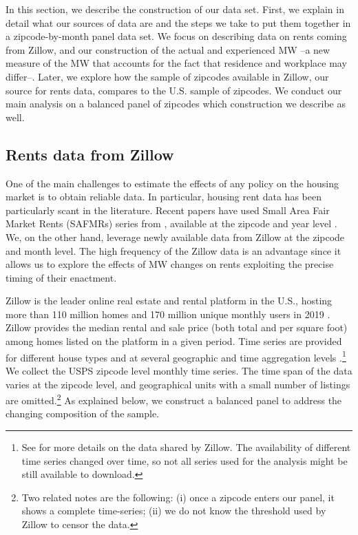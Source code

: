 
In this section, we describe the construction of our data set. First, we explain in detail
what our sources of data are and the steps we take to put them together in a zipcode-by-month
panel data set. We focus on describing data on rents coming from Zillow, and our
construction of the actual and experienced MW --a new measure of the MW that accounts
for the fact that residence and workplace may differ--. Later, we explore how the 
sample of zipcodes available in Zillow, our source for rents data, compares to the 
U.S. sample of zipcodes. We conduct our main analysis on a balanced panel of zipcodes 
which construction we describe as well.

\subsection{Rents data from Zillow}

One of the main challenges to estimate the effects of any policy on the housing market
is to obtain reliable data. In particular, housing rent data has been particularly scant
in the literature. Recent papers have used Small Area Fair Market Rents (SAFMRs) series 
from \textcite{hud}, available at the zipcode and year level \parencite{Tidemann2018, 
Yamagishi2019}. We, on the other hand, leverage newly available data from Zillow at the 
zipcode and month level. The high frequency of the Zillow data is an advantage since it 
allows us to explore the effects of MW changes on rents exploiting the precise timing of 
their enactment.

Zillow is the leader online real estate and rental platform in the U.S., hosting more 
than 110 million homes and 170 million unique monthly users in 2019 
\parencite{ZillowFacts}. Zillow provides the median rental and sale price (both 
total and per square foot) among homes listed on the platform in a given period. Time 
series are provided for different house types and at several geographic and time 
aggregation levels \parencite{ZillowData}.\footnote{See \textcite{ZillowData} for 
	more details on the data shared by Zillow. The availability of different time 
	series changed over time, so not all series used for the analysis might be still 
	available to download.} 
We collect the USPS zipcode level monthly time series. The time span of the data 
varies at the zipcode level, and geographical units with a small number of listings
are omitted.\footnote{Two related notes are the following: (i) once a zipcode 
enters our panel, it shows a complete time-series; (ii) we do not know the threshold
used by Zillow to censor the data.} 
As explained below, we construct a balanced panel to address the changing composition 
of the sample.

